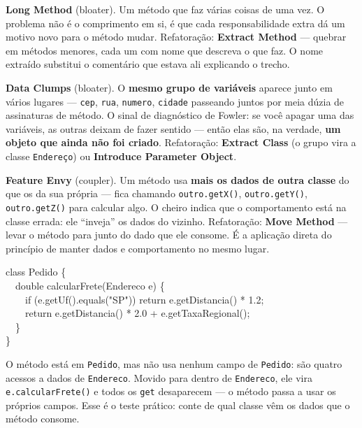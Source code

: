 \begin{conceito}
\textbf{Long Method} (bloater). Um método que faz várias coisas de uma vez.
O problema não é o comprimento em si, é que cada responsabilidade extra dá
um motivo novo para o método mudar. Refatoração: \textbf{Extract Method} ---
quebrar em métodos menores, cada um com nome que descreva o que faz. O nome
extraído substitui o comentário que estava ali explicando o trecho.

\textbf{Data Clumps} (bloater). O \textbf{mesmo grupo de variáveis} aparece
junto em vários lugares --- \texttt{cep}, \texttt{rua}, \texttt{numero},
\texttt{cidade} passeando juntos por meia dúzia de assinaturas de método. O
sinal de diagnóstico de Fowler: se você apagar uma das variáveis, as outras
deixam de fazer sentido --- então elas são, na verdade, \textbf{um objeto que
ainda não foi criado}. Refatoração: \textbf{Extract Class} (o grupo vira a
classe \texttt{Endereço}) ou \textbf{Introduce Parameter Object}.

\textbf{Feature Envy} (coupler). Um método usa \textbf{mais os dados de outra
classe} do que os da sua própria --- fica chamando
\texttt{outro.getX()}, \texttt{outro.getY()}, \texttt{outro.getZ()} para
calcular algo. O cheiro indica que o comportamento está na classe errada:
ele “inveja” os dados do vizinho. Refatoração: \textbf{Move Method} --- levar
o método para junto do dado que ele consome. É a aplicação direta do
princípio de manter dados e comportamento no mesmo lugar.
\end{conceito}

\begin{exemplo}
\begin{flushleft}\ttfamily\small
class Pedido \{ \\
~~double calcularFrete(Endereco e) \{ \\
~~~~if (e.getUf().equals("SP")) return e.getDistancia() * 1.2; \\
~~~~return e.getDistancia() * 2.0 + e.getTaxaRegional(); \\
~~\} \\
\}
\end{flushleft}

O método está em \texttt{Pedido}, mas não usa nenhum campo de
\texttt{Pedido}: são quatro acessos a dados de \texttt{Endereco}. Movido
para dentro de \texttt{Endereco}, ele vira
\texttt{e.calcularFrete()} e todos os \texttt{get} desaparecem --- o método
passa a usar os próprios campos. Esse é o teste prático: conte de qual
classe vêm os dados que o método consome.
\end{exemplo}

